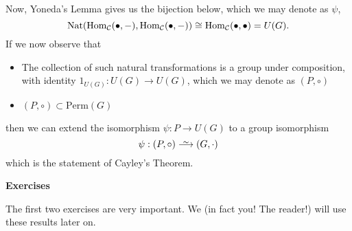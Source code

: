 \begin{prf}
\begin{center}
            \hspace{0.7cm}
        \end{center}
        Now, Yoneda's Lemma gives us the bijection below, which we may denote as 
        $\psi$,
        \[
            \text{Nat}(\operatorname{\mathrm{Hom}}_{\mathcal{C}}(\bullet, -), \operatorname{\mathrm{Hom}}_{\mathcal{C}}(\bullet, -))
            \cong
            \operatorname{\mathrm{Hom}}_{\mathcal{C}}(\bullet, \bullet) = U(G).
        \]
        If we now observe that 
        \begin{itemize}
            \item The collection of such natural transformations is a group under composition, with identity $1_{U(G)}: U(G) \to U(G)$,
            which we may denote as $(P, \circ)$
            \item $(P,  \circ) \subset \text{Perm}(G)$ 
        \end{itemize}
        then we can extend the isomorphism $\psi: P \to U(G)$ to a group isomorphism 
        \[
            \psi: (P, \circ) \isomarrow (G, \cdot) 
        \]
        which is the statement of Cayley's Theorem.
    \end{prf}

    {\large \textbf{Exercises}
    \vspace{0.5cm}}

    The first two exercises are very important. We (in fact you! The reader!) will 
    use these results later on. 


